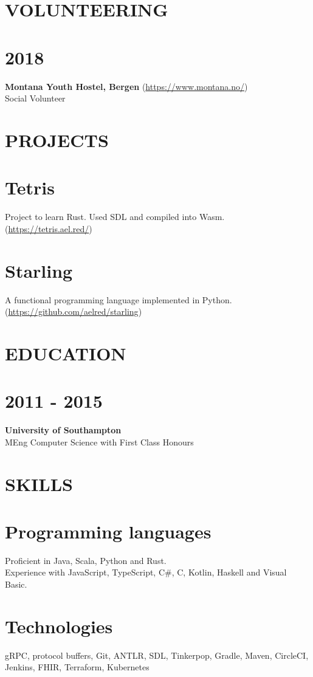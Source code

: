 \documentclass[margin]{res}
\begin{document}
\begin{resume}
\begin{itemize}
\end{itemize}

\section{VOLUNTEERING}

\normalsize{\section{2018}}
{\bf Montana Youth Hostel, Bergen} (\href{https://www.montana.no/}{https://www.montana.no/}) \\
Social Volunteer

\section{PROJECTS}

\normalsize{\section{Tetris}}
Project to learn Rust. Used SDL and compiled into Wasm. (\href{https://tetris.ael.red/}{https://tetris.ael.red/})

\normalsize{\section{Starling}}
A functional programming language implemented in Python. (\href{https://github.com/aelred/starling}{https://github.com/aelred/starling})

\section{EDUCATION}
\normalsize{\section{2011 - 2015}}
{\bf University of Southampton} \\
MEng Computer Science with First Class Honours \\

\section{SKILLS}

\normalsize{\section{Programming languages}}
Proficient in Java, Scala, Python and Rust. \\
Experience with JavaScript, TypeScript, C\#, C, Kotlin, Haskell and Visual Basic.

\normalsize{\section{Technologies}}
gRPC, protocol buffers, Git, ANTLR, SDL, Tinkerpop, Gradle, Maven, CircleCI, Jenkins, FHIR, Terraform, Kubernetes

\end{resume}
\end{document}
